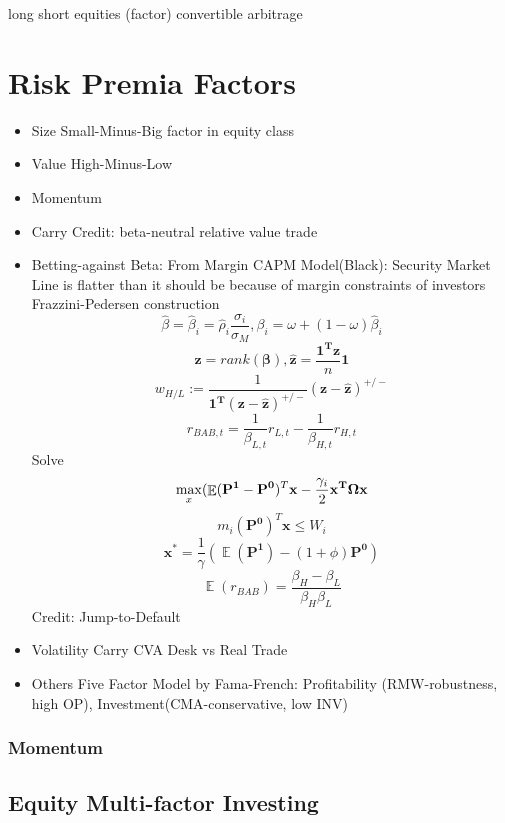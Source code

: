 \documentclass[11pt, openany]{book}              %
\DeclareMathOperator{\E}{\mathbb{E}}
\begin{document}
long short equities (factor) 
convertible arbitrage

\section{Risk Premia Factors}

\begin{itemize}
	\item Size
		\subitem Small-Minus-Big factor in equity class
	\item Value
		\subitem High-Minus-Low 
		\subitem
	\item Momentum
		\subitem
	\item Carry
		\subitem Credit: beta-neutral relative value trade
	\item Betting-against Beta: 
		\subitem From Margin CAPM Model(Black): Security Market Line is flatter than it should be because of margin constraints of investors
		\subitem Frazzini-Pedersen construction 
		$$ \hat{\beta} = \hat{\beta}_i = \hat{\rho}_i \frac{\sigma_i}{\hat{\sigma}_M}, \beta_i = \omega + (1-\omega) \hat{\beta}_i$$
		$$ \boldsymbol{z} = rank(\boldsymbol{\beta}), \boldsymbol{\hat{z}} = \frac{\boldsymbol{1^Tz}}{n}\boldsymbol{1}$$
		$$ w_{H/L} := \frac{1}{\boldsymbol{1^T}(\boldsymbol{z}-\boldsymbol{\hat{z}})^{+/-}}(\boldsymbol{z}-\boldsymbol{\hat{z}})^{+/-} $$ 
		$$ r_{BAB,t} = \frac{1}{\beta_{L,t}}r_{L,t} -\frac{1}{\beta_{H,t}}r_{H,t}$$
		Solve
		$$ \max_{x} (\E(\mathbf{P^1} - \mathbf{P^0})^T \mathbf{x} - \frac{\gamma_i}{2} \bold{x^T\Omega x}$$
		$$ m_i (\mathbf{P^0})^T \mathbf{x} \leq W_i$$
		$$ \mathbf{x^*} = \frac{1}{\gamma}(\E(\mathbf{P^1}) - (1+\phi)\mathbf{P^0})$$
		$$ \E(r_{BAB}) = \frac{\beta_H - \beta_L}{\beta_H \beta_L}$$
		\subitem Credit: Jump-to-Default
	\item Volatility Carry
		\subitem CVA Desk vs Real Trade
	\item Others
		\subitem Five Factor Model by Fama-French: Profitability (RMW-robustness, high OP), Investment(CMA-conservative, low INV)
\end{itemize}



\subsubsection{Momentum}



\subsection{Equity Multi-factor Investing}
\end{document}
